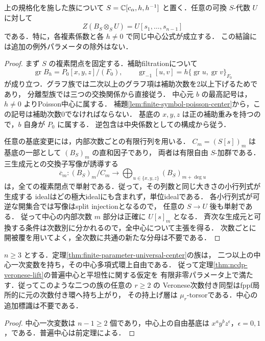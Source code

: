 \begin{theorem}[全ての有限非零パラメータにおける普遍中心]
\label{thm:finite-parameter-universal-center}
上の規格化を施した族について
$S=\mathbb C[c_\alpha,h,h^{-1}]$ と置く．任意の可換 $S$-代数 $U$ に対して
\[
 Z(B_S\otimes_S U)=U[s_1,\ldots,s_{n-1}]
\]
である．特に，各複素係数と各 $h\ne0$ で同じ中心公式が成立する．
この結論には追加の例外パラメータの除外はない．
\end{theorem}
\begin{proof}
まず $S$ の複素閉点を固定する．補助filtrationについて
\[
 \operatorname{gr}B_h=P_0[x,y,z]/(F_0),\qquad
 \operatorname{gr}_{-1}[u,v]=h\{\operatorname{gr}u,\operatorname{gr}v\}_{F_0}
\]
が成り立つ．グラフ族では二次以上のグラフ項は補助次数を2以上下げるためであり，
分離型族では三つの交換関係から直接従う．
中心元 $b$ の最高記号は，$h\ne0$ よりPoisson中心に属する．
補題\ref{lem:finite-symbol-poisson-center}から，この記号は補助次数0でなければならない．
基底の $x,y,z$ は正の補助重みを持つので，$b$ 自身が $P_0$ に属する．
逆包含は中央係数としての構成から従う．

任意の基底変更には，内部次数ごとの有限行列を用いる．
$C_m=(S[s])_m$ は基底の一部として $(B_S)_m$ の直和因子であり，
両者は有限自由 $S$-加群である．三生成元との交換子写像が誘導する
\[
 \overline c_m:(B_S)_m/C_m
 \longrightarrow\bigoplus_{u\in\{x,y,z\}}(B_S)_{m+\deg u}
\]
は，全ての複素閉点で単射である．従って，その列数と同じ大きさの小行列式が生成する
idealはどの極大idealにも含まれず，単位idealである．
各小行列式が可逆な開集合では写像はsplit injectionとなるので，
任意の $S\to U$ 後も単射である．
従って中心の内部次数 $m$ 部分は正確に $U[s]_m$ となる．
斉次な生成元と可換する条件は次数別に分かれるので，全中心について主張を得る．
次数ごとに開被覆を用いてよく，全次数に共通の新たな分母は不要である．
\end{proof}

\begin{corollary}[有限パラメータでのVeronese持上げの代数的仮定]
\label{cor:finite-parameter-veronese-input}
$n\ge3$ とする．定理\ref{thm:finite-parameter-universal-center}の族は，
二つ以上の中心一次変数を持ち，その中心多項式環上自由である．
従って定理\ref{thm:ncdp-veronese-lift}の普遍中心と平坦性に関する仮定を
有限非零パラメータ上で満たす．従ってこのような二つの族の任意の $r\ge2$ の
Veronese次数付き同型はfppf局所的に元の次数付き環へ持ち上がり，
その持上げ層は $\mu_r$-torsorである．中心の追加標識は不要である．
\end{corollary}
\begin{proof}
中心一次変数は $n-1\ge2$ 個であり，中心上の自由基底は
$x^ay^bz^\epsilon$，$\epsilon=0,1$，である．普遍中心は前定理による．
\end{proof}

